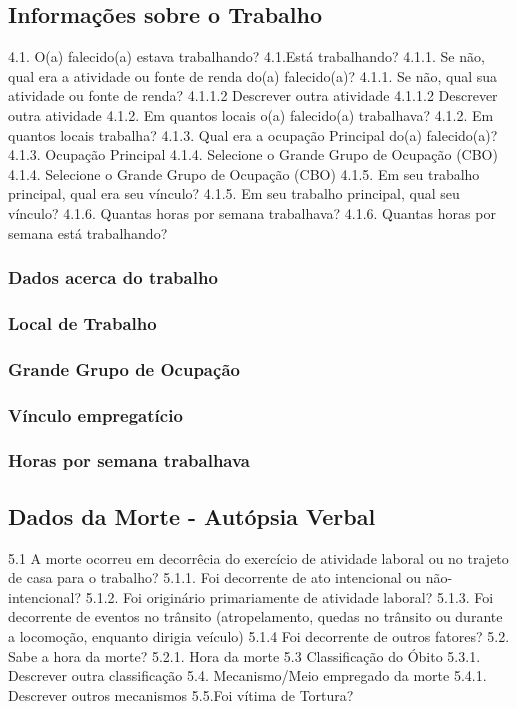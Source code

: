 \subsection{Informações sobre o Trabalho}

4.1. O(a) falecido(a) estava trabalhando?	4.1.Está trabalhando?
4.1.1. Se não, qual era a atividade ou fonte de renda do(a) falecido(a)?	4.1.1. Se não, qual sua atividade ou fonte de renda?
4.1.1.2 Descrever outra atividade	4.1.1.2 Descrever outra atividade
4.1.2. Em quantos locais o(a) falecido(a) trabalhava?	4.1.2. Em quantos locais trabalha?
4.1.3. Qual era a ocupação Principal do(a) falecido(a)?	4.1.3. Ocupação Principal
4.1.4. Selecione o Grande Grupo de Ocupação (CBO)	4.1.4. Selecione o Grande Grupo de Ocupação (CBO)
4.1.5. Em seu trabalho principal, qual era seu vínculo?	4.1.5. Em seu trabalho principal, qual seu vínculo?
4.1.6. Quantas horas por semana trabalhava?	4.1.6. Quantas horas por semana está trabalhando?

\subsubsection{Dados acerca do trabalho}

\subsubsection{Local de Trabalho}

\subsubsection{Grande Grupo de Ocupação}

\subsubsection{Vínculo empregatício}

\subsubsection{Horas por semana trabalhava}

\subsection{Dados da Morte - Autópsia Verbal}



5.1 A morte ocorreu em decorrêcia do exercício de atividade laboral ou no trajeto de casa para o trabalho?
5.1.1. Foi decorrente de ato intencional ou não-intencional?
5.1.2. Foi originário primariamente de atividade laboral?
5.1.3. Foi decorrente de eventos no trânsito (atropelamento, quedas no trânsito ou durante a locomoção, enquanto dirigia veículo)
5.1.4 Foi decorrente de outros fatores?
5.2. Sabe a hora da morte?
5.2.1. Hora da morte
5.3 Classificação do Óbito
5.3.1. Descrever outra classificação
5.4. Mecanismo/Meio empregado da morte
5.4.1. Descrever outros mecanismos
5.5.Foi vítima de Tortura?


